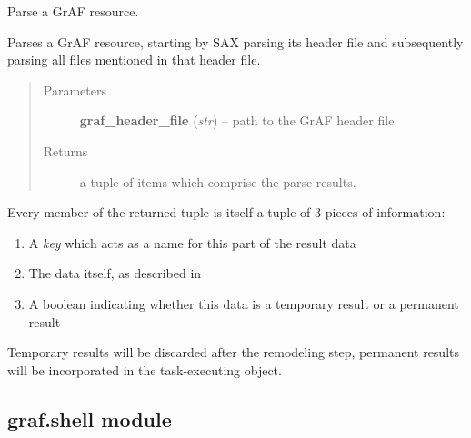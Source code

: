 \documentclass[letterpaper,10pt,english]{sphinxmanual}
\begin{document}

\begin{fulllineitems}
\label{graf/graf:graf.parse.parse}
Parse a GrAF resource.

Parses a GrAF resource, starting by SAX parsing its header file and subsequently parsing all
files mentioned in that header file.
\begin{quote}\begin{description}
\item[{Parameters}] \leavevmode
\textbf{graf\_header\_file} (\emph{str}) --
path to the GrAF header file

\item[{Returns}] \leavevmode
a tuple of items which comprise the parse results.

\end{description}\end{quote}

Every member of the returned tuple is itself a tuple of 3 pieces of information:
\begin{enumerate}
\item {} 
A \emph{key} which acts as a name for this part of the result data

\item {} 
The data itself, as described in {\hyperref[graf/graf:graf.parse.AnnotationHandler]{}}

\item {} 
A boolean indicating whether this data is a temporary result or a permanent result

\end{enumerate}

Temporary results will be discarded after the remodeling step, permanent results will be incorporated in
the task-executing object.

\end{fulllineitems}



\subsection{graf.shell module}
\label{graf/graf:graf-shell-module}\label{graf/graf:module-graf.shell}
\end{document}
